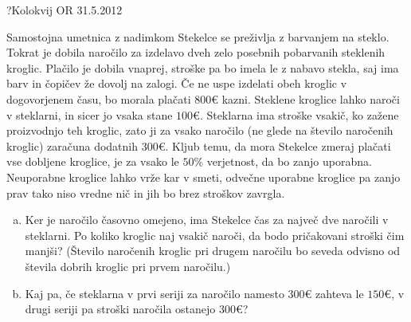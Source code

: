 \begin{naloga}{?}{Kolokvij OR 31.5.2012}
\begin{vprasanje}
Samostojna umetnica z nadimkom Stekelce se preživlja z barvanjem na steklo.
Tokrat je dobila naročilo
za izdelavo dveh zelo posebnih pobarvanih steklenih kroglic.
Plačilo je dobila vnaprej, stroške pa bo imela le z nabavo stekla,
saj ima barv in čopičev že dovolj na zalogi.
Če ne uspe izdelati obeh kroglic v dogovorjenem času,
bo morala plačati $800 €$ kazni.
Steklene kroglice lahko naroči v steklarni, in sicer jo vsaka stane $100 €$.
Steklarna ima stroške vsakič, ko zažene proizvodnjo teh kroglic,
zato ji za vsako naročilo (ne glede na število naročenih kroglic)
zaračuna dodatnih $300 €$.
Kljub temu, da mora Stekelce zmeraj plačati vse dobljene kroglice,
je za vsako le $50 \%$ verjetnost, da bo zanjo uporabna.
Neuporabne kroglice lahko vrže kar v smeti,
odvečne uporabne kroglice pa zanjo prav tako niso vredne nič
in jih bo brez stroškov zavrgla.
\begin{enumerate}[(a)]
\item Ker je naročilo časovno omejeno,
ima Stekelce čas za največ dve naročili v steklarni.
Po koliko kroglic naj vsakič naroči, da bodo pričakovani stroški čim manjši?
(Število naročenih kroglic pri drugem naročilu
bo seveda odvisno od števila dobrih kroglic pri prvem naročilu.)

\item Kaj pa,
če steklarna v prvi seriji za naročilo namesto $300 €$ zahteva le $150 €$,
v drugi seriji pa stroški naročila ostanejo $300 €$?
\end{enumerate}
\end{vprasanje}
\begin{odgovor}
\end{odgovor}
\end{naloga}
